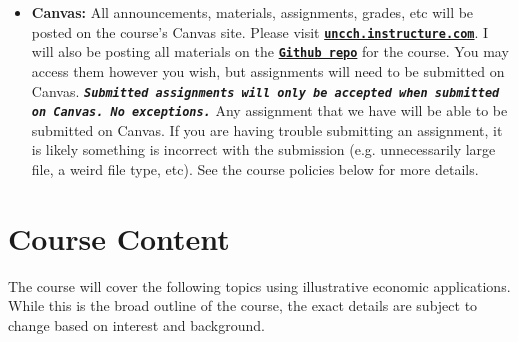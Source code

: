 \documentclass[11pt]{article}
\begin{document}
\begin{itemize}
    
    \item \textbf{Canvas:} All announcements, materials, assignments, grades, etc will be posted on the course's Canvas site. Please visit \href{https://uncch.instructure.com/}{\tt\bf uncch.instructure.com}. I will also be posting all materials on the \href{https://github.com/drewvankuiken/ECON370}{\tt\bf Github repo} for the course. You may access them however you wish, but assignments will need to be submitted on Canvas. {\tt\bf  \emph{Submitted assignments will only be accepted when submitted on Canvas. No exceptions.}} Any assignment that we have will be able to be submitted on Canvas. If you are having trouble submitting an assignment, it is likely something is incorrect with the submission (e.g. unnecessarily large file, a weird file type, etc). See the course policies below for more details.
\end{itemize}


\section*{Course Content}
The course will cover the following topics using illustrative economic applications. While this is the broad outline of the course, the exact details are subject to change based on interest and background.
\end{document}

